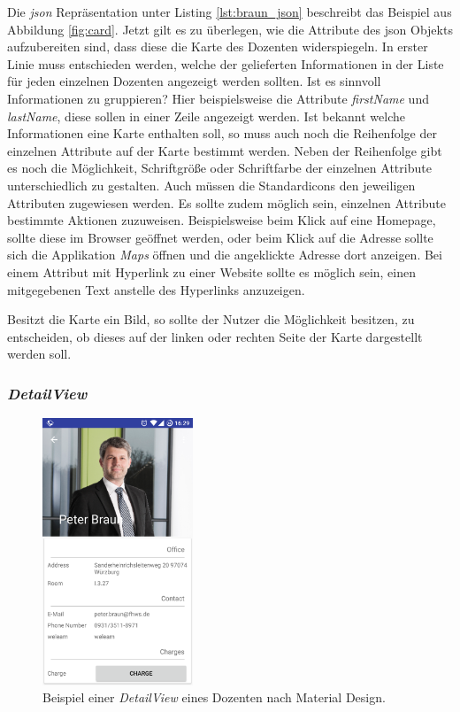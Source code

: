 Die  \textit{\acf{json}} Repräsentation unter Listing \ref{lst:braun_json} beschreibt das Beispiel aus Abbildung \ref{fig:card}.
Jetzt gilt es zu überlegen, wie die Attribute des \ac{json} Objekts aufzubereiten sind, dass diese die Karte des Dozenten widerspiegeln. 
In erster Linie muss entschieden werden, welche der gelieferten Informationen in der Liste für jeden einzelnen Dozenten angezeigt werden sollten. Ist es sinnvoll Informationen zu gruppieren? Hier beispielsweise die Attribute \textit{firstName} und \textit{lastName}, diese sollen in einer Zeile angezeigt werden. Ist bekannt welche Informationen eine Karte enthalten soll, so muss auch noch die Reihenfolge der einzelnen Attribute auf der Karte bestimmt werden.
Neben der Reihenfolge gibt es noch die Möglichkeit, Schriftgröße oder Schriftfarbe der einzelnen Attribute unterschiedlich zu gestalten. Auch müssen die Standardicons den jeweiligen Attributen zugewiesen werden. Es sollte zudem möglich sein, einzelnen Attribute bestimmte Aktionen zuzuweisen. Beispielsweise beim Klick auf eine Homepage, sollte diese im Browser geöffnet werden, oder beim Klick auf die Adresse sollte sich die Applikation \textit{Maps} öffnen und die angeklickte Adresse dort anzeigen. Bei einem Attribut mit Hyperlink zu einer Website sollte es möglich sein, einen mitgegebenen Text anstelle des Hyperlinks anzuzeigen. 

Besitzt die Karte ein Bild, so sollte der Nutzer die Möglichkeit besitzen, zu entscheiden, ob dieses auf der linken oder rechten Seite der Karte dargestellt werden soll.

\subsubsection{\textit{DetailView}}

\begin{figure}[H]
	\begin{center}
		\includegraphics[width=0.4\textwidth]{images/detail.png}
		\caption{Beispiel einer \textit{DetailView} eines Dozenten nach Material Design.}
		\label{fig:detail}
	\end{center}
\end{figure}

